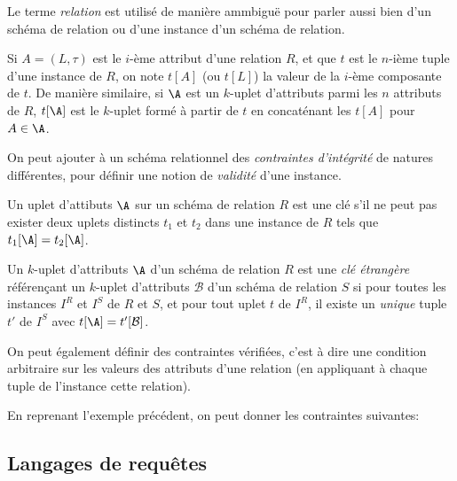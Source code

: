 \documentclass[french, toc]{../cs-classes/cs-classes}
\begin{document}
\begin{remarque}
    Le terme \emph{relation} est utilisé de manière ammbiguë pour parler aussi bien d'un schéma de relation ou d'une instance d'un schéma de relation.
\end{remarque}

Si $A=(L, \tau)$ est le $i$-ème attribut d'une relation $R$, et que $t$ est le $n$-ième tuple d'une instance de $R$, on note $t[A]$ (ou $t[L]$) la valeur de la $i$-ème composante de $t$. De manière similaire, si $\A$ est un $k$-uplet d'attributs parmi les $n$ attributs de $R$, $t[\A]$ est le $k$-uplet formé à partir de $t$ en concaténant les $t[A]$ pour $A\in\A$.

On peut ajouter à un schéma relationnel des \emph{contraintes d'intégrité} de natures différentes, pour définir une notion de \emph{validité} d'une instance.
\begin{definition}[Clé]
    Un uplet d'attibuts $\A$ sur un schéma de relation $R$ est une clé s'il ne peut pas exister deux uplets distincts $t_1$ et $t_2$ dans une instance de $R$ tels que $t_1[\A]=t_2[\A]$.
\end{definition}

\begin{definition}
    Un $k$-uplet d'attributs $\A$ d'un schéma de relation $R$ est une \emph{clé étrangère} référençant un $k$-uplet d'attributs $\mathcal{B}$ d'un schéma de relation $S$ si pour toutes les instances $I^R$ et $I^S$ de $R$ et $S$, et pour tout uplet $t$ de $I^R$, il existe un \emph{unique} tuple $t'$ de $I^S$ avec $t[\A]=t'[\mathcal{B}]$.
\end{definition}

On peut également définir des contraintes vérifiées, c'est à dire une condition arbitraire sur les valeurs des attributs d'une relation (en appliquant à chaque tuple de l'instance cette relation).

\begin{exemple}
    En reprenant l'exemple précédent, on peut donner les contraintes suivantes:
\end{exemple}


\subsection{Langages de requêtes}
\end{document}
